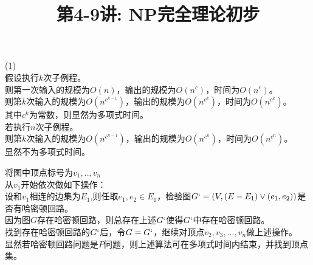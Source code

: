 \documentclass[a4paper, justified]{tufte-handout}
\title{第4-9讲: NP完全理论初步}
\date{\zhtoday} %
\begin{document}
\maketitle
\noplagiarism %
\begin{abstract}
\end{abstract}
\beginrequired

\begin{problem}[TC  34.1-5]
\end{problem}

\begin{solution}
(1)\\
假设执行$k$次子例程。\\
则第一次输入的规模为$O(n)$，输出的规模为$O(n^c)$，时间为$O(n^c)$。\\
则第$k$次输入的规模为$O(n^{c^{k-1}})$，输出的规模为$O(n^{c^k})$，时间为$O(n^{c^k})$。\\
其中$c^k$为常数，则显然为多项式时间。\\

\noindent 若执行$n$次子例程。\\
则第$k$次输入的规模为$O(n^{c^{n-1}})$，输出的规模为$O(n^{c^n})$，时间为$O(n^{c^n})$。\\
显然不为多项式时间。
\end{solution}

\begin{problem}[TC 34.2-3]
\end{problem}

\begin{solution}
将图中顶点标号为$v_1,..,v_n$\\
从$v_1$开始依次做如下操作：	\\
设和$v_1$相连的边集为$E_1$,则任取$e_1,e_2\in E_1$，检验图$G`=(V,(E-E_1)\lor(e_1,e_2))$是否有哈密顿回路。\\
因为图$G$存在哈密顿回路，则总存在上述$G`$使得$G`$中存在哈密顿回路。\\
找到存在哈密顿回路的$G`$后，令$G=G`$，继续对顶点$v_2,v_3,...,v_n$做上述操作。\\
显然若哈密顿回路问题是$P$问题，则上述算法可在多项式时间内结束，并找到顶点集。\\
\end{solution}
\end{document}
